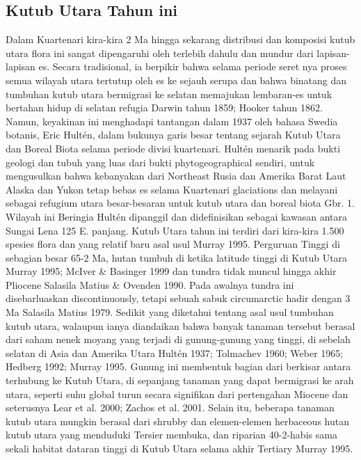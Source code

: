 \subsection{Kutub Utara Tahun ini}

		Dalam Kuartenari {kira-kira 2 Ma hingga sekarang} distribusi dan komposisi kutub utara flora ini sangat dipengaruhi oleh terlebih dahulu dan mundur dari 
	lapisan-lapisan es. Secara tradisional, ia berpikir bahwa selama periode seret nya proses semua wilayah utara tertutup oleh es ke sejauh serupa dan bahwa
	binatang dan tumbuhan kutub utara bermigrasi ke selatan memajukan lembaran-es untuk bertahan hidup di selatan refugia {Darwin tahun 1859; Hooker tahun 1862}.
	Namun, keyakinan ini menghadapi tantangan dalam 1937 oleh bahasa Swedia botanis, Eric Hultén, dalam bukunya garis besar tentang sejarah Kutub Utara dan 
	Boreal Biota selama periode divisi kuartenari. Hultén menarik pada bukti geologi dan tubuh yang luas dari bukti phytogeographical sendiri, untuk mengusulkan
	bahwa kebanyakan dari Northeast Rusia dan Amerika Barat Laut {Alaska dan Yukon} tetap bebas es selama Kuartenari glaciations dan melayani sebagai refugium 
	utara besar-besaran untuk kutub utara dan boreal biota {Gbr. 1}. Wilayah ini Beringia Hultén dipanggil dan didefinisikan sebagai kawasan antara Sungai Lena 
	{125 E. panjang.}
		Kutub Utara tahun ini terdiri dari kira-kira 1.500 spesies flora dan yang relatif baru asal usul {Murray 1995}. Perguruan Tinggi di sebagian besar {65-2 Ma}, 
	hutan tumbuh di ketika latitude tinggi di Kutub Utara {Murray 1995; McIver \& Basinger 1999} dan tundra tidak muncul hingga akhir Pliocene {Salasila Matius \& Ovenden 1990}.
	Pada awalnya tundra ini disebarluaskan discontinuously, tetapi sebuah sabuk circumarctic hadir dengan 3 Ma {Salasila Matius 1979}. 
	Sedikit yang diketahui tentang asal usul tumbuhan kutub utara, walaupun ianya diandaikan bahwa banyak tanaman tersebut berasal dari saham nenek moyang yang terjadi 
	di gunung-gunung yang tinggi, di sebelah selatan di Asia dan Amerika Utara {Hultén 1937; Tolmachev 1960; Weber 1965; Hedberg 1992; Murray 1995}. Gunung ini membentuk 
	bagian dari berkisar antara terhubung ke Kutub Utara, di sepanjang tanaman yang dapat bermigrasi ke arah utara, seperti suhu global turun secara signifikan dari 
	pertengahan Miocene dan seterusnya {Lear et al. 2000; Zachos et al. 2001}. Selain itu, beberapa tanaman kutub utara mungkin berasal dari shrubby dan elemen-elemen 
	herbaceous hutan kutub utara yang menduduki Tersier membuka, dan riparian {40-2}-habis sama sekali habitat dataran tinggi di Kutub Utara selama akhir 
	Tertiary {Murray 1995}.
	

